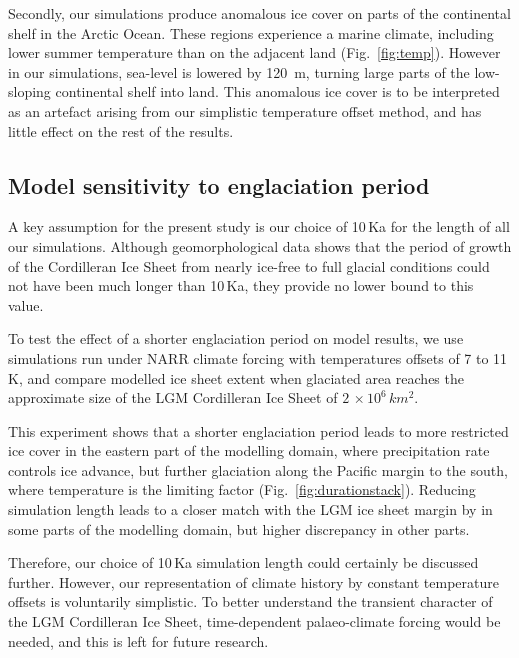Secondly, our simulations produce anomalous ice cover on parts of the continental shelf in the Arctic Ocean. These regions experience a marine climate, including lower summer temperature than on the adjacent land (Fig.~\ref{fig:temp}). However in our simulations, sea-level is lowered by 120~m, turning large parts of the low-sloping continental shelf into land. This anomalous ice cover is to be interpreted as an artefact arising from our simplistic temperature offset method, and has little effect on the rest of the results.

\subsection{Model sensitivity to englaciation period}

A key assumption for the present study is our choice of 10\,Ka for the length of all our simulations. Although geomorphological data shows that the period of growth of the Cordilleran Ice Sheet from nearly ice-free to full glacial conditions could not have been much longer than 10\,Ka, they provide no lower bound to this value.

To test the effect of a shorter englaciation period on model results, we use simulations run under NARR climate forcing with temperatures offsets of 7 to 11\,K, and compare modelled ice sheet extent when glaciated area reaches the approximate size of the LGM Cordilleran Ice Sheet of $2\,\times10^6\,\unit{km^2}$.

This experiment shows that a shorter englaciation period leads to more restricted ice cover in the eastern part of the modelling domain, where precipitation rate controls ice advance, but further glaciation along the Pacific margin to the south, where temperature is the limiting factor (Fig.~\ref{fig:durationstack}). Reducing simulation length leads to a closer match with the LGM ice sheet margin by \citet{dyke-2004} in some parts of the modelling domain, but higher discrepancy in other parts.

Therefore, our choice of 10\,Ka simulation length could certainly be discussed further. However, our representation of climate history by constant temperature offsets is voluntarily simplistic. To better understand the transient character of the LGM Cordilleran Ice Sheet, time-dependent palaeo-climate forcing would be needed, and this is left for future research.

